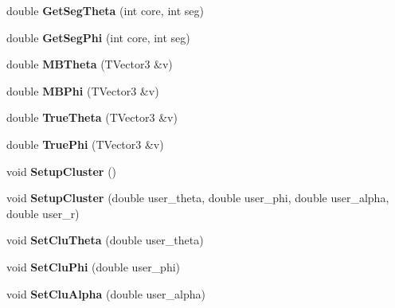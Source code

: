 \begin{DoxyCompactItemize}
double {\bfseries Get\+Seg\+Theta} (int core, int seg)
\item 
\mbox{\label{class_m_b_geometry_a575ddd6022d2d686a83ebce3195b6c50}} 
double {\bfseries Get\+Seg\+Phi} (int core, int seg)
\item 
\mbox{\label{class_m_b_geometry_af4adfb858000405b21f79a6bf10c3c37}} 
double {\bfseries M\+B\+Theta} (T\+Vector3 \&v)
\item 
\mbox{\label{class_m_b_geometry_a399568d67bb83801ef6a2dbe963a535e}} 
double {\bfseries M\+B\+Phi} (T\+Vector3 \&v)
\item 
\mbox{\label{class_m_b_geometry_afd393f9db7182de7fb19f0c934edb383}} 
double {\bfseries True\+Theta} (T\+Vector3 \&v)
\item 
\mbox{\label{class_m_b_geometry_a718d9c7fcc4a5fb8b9ecaabdc7a0503f}} 
double {\bfseries True\+Phi} (T\+Vector3 \&v)
\item 
\mbox{\label{class_m_b_geometry_a4d98a38f0dc1ca6a4a73477dde5cdd8d}} 
void {\bfseries Setup\+Cluster} ()
\item 
\mbox{\label{class_m_b_geometry_a93f157cebad3f63dbbefb5b08f3555af}} 
void {\bfseries Setup\+Cluster} (double user\+\_\+theta, double user\+\_\+phi, double user\+\_\+alpha, double user\+\_\+r)
\item 
\mbox{\label{class_m_b_geometry_a9a2a8c9609141be92d7ba30e6087aa30}} 
void {\bfseries Set\+Clu\+Theta} (double user\+\_\+theta)
\item 
\mbox{\label{class_m_b_geometry_a74142f84cf6317d52ae39c0e0ff8a87e}} 
void {\bfseries Set\+Clu\+Phi} (double user\+\_\+phi)
\item 
\mbox{\label{class_m_b_geometry_a0d4868b0360a6e5534918a9813540015}} 
void {\bfseries Set\+Clu\+Alpha} (double user\+\_\+alpha)
\item 
\mbox{\label{class_m_b_geometry_a292c4326421c78871667e91c3694ae35}} 

\end{DoxyCompactItemize}
